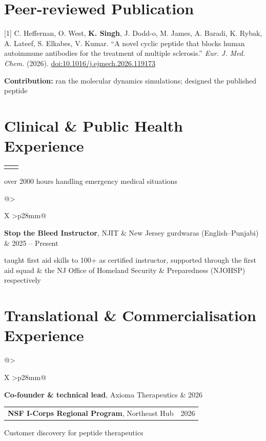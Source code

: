 \documentclass[a4paper,11pt]{article}
\makeatletter
\newcommand{\cvsection}[1]{\Needspace{4\baselineskip}\section*{#1}}
\newcommand{\entry}[4]{%
  \Needspace{4\baselineskip}%
  \begin{tabularx}{\linewidth}{@{}>{\raggedright\arraybackslash}X
    >{\raggedleft\arraybackslash}p{33mm}@{}}%
    \textbf{#1} & {\small #2}\\%
    \multicolumn{2}{@{}p{\linewidth}@{}}{{\small #3\if\relax\detokenize{#4}\relax\else\enspace|\enspace #4\fi}}%
  \end{tabularx}\par
}
\newcommand{\dated}[2]{%
  \begin{tabularx}{\linewidth}{@{}>{\raggedright\arraybackslash}X
    >{\raggedleft\arraybackslash}p{28mm}@{}}%
    #1 & {\small #2}%
  \end{tabularx}\par
}
\newcommand{\gap}{\vspace{3pt}}
\newcommand{\me}[1]{\textbf{#1}}
\makeatother
\begin{document}
\cvsection{Peer-reviewed Publication}
\begin{minipage}{\linewidth}
{\small
  [1] C. Heffernan, O. West, \me{K. Singh}, J. Dodd-o, M. James, A. Baradi,
  K. Rybak, A. Lateef, S. Elkabes, V. Kumar.
  ``A novel cyclic peptide that blocks human autoimmune antibodies for the treatment
  of multiple sclerosis.'' \textit{Eur. J. Med. Chem.} (2026).
  \href{https://doi.org/10.1016/j.ejmech.2026.119173}{doi:10.1016/j.ejmech.2026.119173}\par
  \vspace{2pt}
  \textbf{Contribution:} ran the molecular dynamics simulations; designed the published peptide
}
\end{minipage}

\newpage

\cvsection{Clinical \& Public Health Experience}
\entry{Emergency Medical Technician (New Jersey licence)}
  {Apr 2022 -- Present}
  {NJIT First Aid Squad (Public Relations Chair); Marlboro First Aid Squad (Cadet Crew Chief)}{}
\begin{cvitems}
  \item over 2000 hours handling emergency medical situations
\end{cvitems}
\gap
\dated{\textbf{Stop the Bleed Instructor}, NJIT \& New Jersey gurdwaras (English--Punjabi)}
  {2025 -- Present}
\begin{cvitems}
  \item taught first aid skills to 100+ as certified instructor, supported through the
    first aid squad \& the NJ Office of Homeland Security \& Preparedness (NJOHSP) respectively
\end{cvitems}

\cvsection{Translational \& Commercialisation Experience}
\dated{\textbf{Co-founder \& technical lead}, Axioma Therapeutics}{2026}
\dated{\textbf{NSF I-Corps Regional Program}, Northeast Hub}{2026}
{\small Customer discovery for peptide therapeutics}\par
\end{document}
